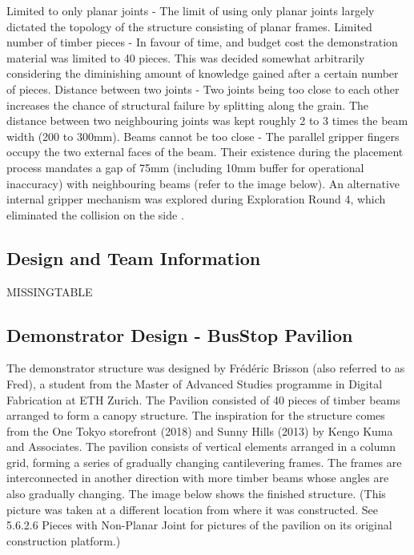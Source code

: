 Limited to only planar joints - The limit of using only planar joints largely dictated the topology of the structure consisting of planar frames. 
Limited number of timber pieces - In favour of time, and budget cost the demonstration material was limited to 40 pieces. This was decided somewhat arbitrarily considering the diminishing amount of knowledge gained after a certain number of pieces.
Distance between two joints - Two joints being too close to each other increases the chance of structural failure by splitting along the grain. The distance between two neighbouring joints was kept roughly 2 to 3 times the beam width (200 to 300mm).
Beams cannot be too close - The parallel gripper fingers occupy the two external faces of the beam. Their existence during the placement process mandates a gap of 75mm (including 10mm buffer for operational inaccuracy) with neighbouring beams (refer to the image below). An alternative internal gripper mechanism was explored during Exploration Round 4, which eliminated the collision on the side .

\subsection{Design and Team Information}
\label{subsection:exploration-2-design-and-team-information}

MISSINGTABLE

\subsection{Demonstrator Design - BusStop Pavilion}
\label{subsection:exploration-2-demonstrator-design-busstop-pavilion}

The demonstrator structure was designed by Frédéric Brisson (also referred to as Fred), a student from the Master of Advanced Studies programme in Digital Fabrication at ETH Zurich. The Pavilion consisted of 40 pieces of timber beams arranged to form a canopy structure. 
The inspiration for the structure comes from the One Tokyo storefront (2018) and Sunny Hills (2013) by Kengo Kuma and Associates. The pavilion consists of vertical elements arranged in a column grid, forming a series of gradually changing cantilevering frames. The frames are interconnected in another direction with more timber beams whose angles are also gradually changing.
The image below shows the finished structure. (This picture was taken at a different location from where it was constructed. See 5.6.2.6 Pieces with Non-Planar Joint for pictures of the pavilion on its original construction platform.)


